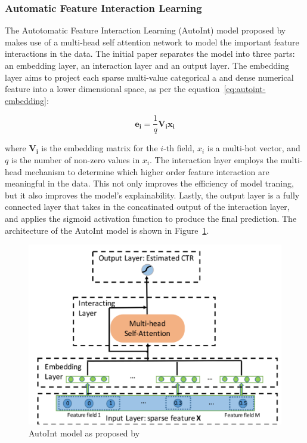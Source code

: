 \documentclass{mldsmsc}
\begin{document}

\subsubsection{Automatic Feature Interaction Learning}

The Autotomatic Feature Interaction Learning (AutoInt) model proposed by
\cite{RefWorks:song2019autoint} makes use of a multi-head self attention
network to model the important feature interactions in the data. The initial 
paper separates the model into three parts: an embedding layer, an interaction layer 
and an output layer. The embedding layer aims to project each sparse multi-value
categorical a and dense numerical feature into a lower dimensional space, as per the equation~\ref{eq:autoint-embedding}:

\begin{equation}
\label{eq:autoint-embedding}
\mathbf{e_i} = \frac{1}{q} \mathbf{V_i x_i}
\end{equation}

where $\mathbf{V_i}$ is the embedding matrix for the $i$-th field, $x_i$ is a multi-hot vector, and $q$ 
is the number of non-zero values in $x_i$. The interaction layer employs the multi-head
mechanism to determine which higher order feature interaction are meaningful in the data. This not only
improves the efficiency of model traning, but it also improves the model's explainability. Lastly,
the output layer is a fully connected layer that takes in the concatinated output 
of the interaction layer, and applies the sigmoid activation function to produce the final prediction.
The architecture of the AutoInt model is shown in Figure~\ref{fig:autoint}.

\begin{figure}[h]
\centering
\includegraphics[width=\textwidth]{../figures/autoint.png}
\caption{AutoInt model as proposed by \cite{RefWorks:song2019autoint}}
\label{fig:autoint}
\end{figure}
\end{document}
